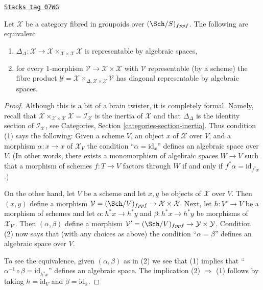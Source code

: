 \begin{lemma}
\label{criteria-lemma-second-diagonal}
\href{https://stacks.math.columbia.edu/tag/07WG}{\texttt{Stacks tag 07WG}}

Let $\mathcal{X}$ be a category fibred in groupoids over $(\Sch/S)_{fppf}$.
The following are equivalent
\begin{enumerate}
\item $\Delta_\Delta : \mathcal{X} \to
\mathcal{X} \times_{\mathcal{X} \times \mathcal{X}} \mathcal{X}$
is representable by algebraic spaces,
\item for every $1$-morphism $\mathcal{V} \to \mathcal{X} \times \mathcal{X}$
with $\mathcal{V}$ representable (by a scheme) the fibre product
$\mathcal{Y} =
\mathcal{X} \times_{\Delta, \mathcal{X} \times \mathcal{X}} \mathcal{V}$
has diagonal representable by algebraic spaces.
\end{enumerate}
\end{lemma}

\begin{proof}
Although this is a bit of a brain twister, it is completely formal.
Namely, recall that
$\mathcal{X} \times_{\mathcal{X} \times \mathcal{X}} \mathcal{X} =
\mathcal{I}_\mathcal{X}$ is the inertia of $\mathcal{X}$ and that
$\Delta_\Delta$ is the identity section of $\mathcal{I}_\mathcal{X}$, see
Categories, Section \ref{categories-section-inertia}.
Thus condition (1) says the following: Given a scheme $V$, an object $x$ of
$\mathcal{X}$ over $V$, and a morphism $\alpha : x \to x$ of $\mathcal{X}_V$
the condition ``$\alpha = \text{id}_x$'' defines an algebraic space over $V$.
(In other words, there exists a monomorphism of algebraic spaces $W \to V$
such that a morphism of schemes $f : T \to V$ factors through $W$
if and only if $f^*\alpha = \text{id}_{f^*x}$.)

\medskip\noindent
On the other hand, let $V$ be a scheme and let $x, y$ be objects of
$\mathcal{X}$ over $V$. Then $(x, y)$ define a morphism
$\mathcal{V} = (\Sch/V)_{fppf} \to \mathcal{X} \times \mathcal{X}$.
Next, let $h : V' \to V$ be a morphism of schemes and let
$\alpha : h^*x \to h^*y$ and $\beta : h^*x \to h^*y$ be morphisms
of $\mathcal{X}_{V'}$. Then $(\alpha, \beta)$ define a morphism
$\mathcal{V}' = (\Sch/V)_{fppf} \to \mathcal{Y} \times \mathcal{Y}$.
Condition (2) now says that (with any choices as above) the
condition ``$\alpha = \beta$'' defines an algebraic space over $V$.

\medskip\noindent
To see the equivalence, given $(\alpha, \beta)$ as in (2) we see that
(1) implies that ``$\alpha^{-1} \circ \beta = \text{id}_{h^*x}$''
defines an algebraic space. The implication (2) $\Rightarrow$ (1)
follows by taking $h = \text{id}_V$ and $\beta = \text{id}_x$.
\end{proof}

